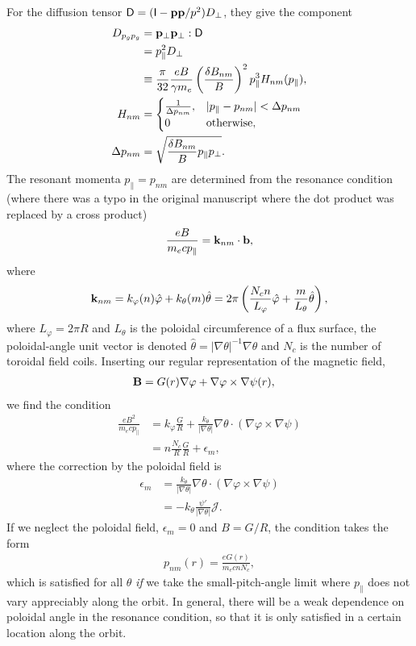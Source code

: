 \documentclass[11pt,a4paper]{article}
\renewcommand{\b}[1]{\ensuremath{ {\bf #1 } }}
\begin{document}
For the diffusion tensor $\mathsf{D} = (\mathsf{I}-\b{p}\b{p}/p^2)D_\perp$, they give the component
\begin{align}
D_{p_g p_g} &=  \b{p}_\perp\b{p}_\perp: \mathsf{D} \nonumber \\
&= p_\parallel^2 D_\perp  \nonumber \\
&\equiv \frac{\pi}{32}\frac{eB}{\gamma m_e}\left(\frac{\delta B_{nm}}{B}\right)^2 p_\parallel^3 H_{nm}(p_\parallel), \nonumber \\
H_{nm} &= \begin{cases}
\frac{1}{\Delta p_{nm}}, & |p_\parallel - p_{nm}| < \Delta p_{nm} \\
0 & \text{otherwise},
\end{cases} \nonumber \\
\Delta p_{nm} &= \sqrt{\frac{\delta B_{nm}}{B}p_\parallel p_\perp}.
\end{align}
The resonant momenta $p_\parallel = p_{nm}$ are determined from the resonance condition (where there was a typo in the original manuscript where the dot product was replaced by a cross product)
\begin{align}
\frac{eB}{m_e c p_\parallel} = \b{k}_{nm}\cdot \b{b}  ,
\end{align}
where 
\begin{align}
\b{k}_{nm} = k_\varphi(n) \hat\varphi + k_\theta(m) \hat\theta = 2\pi \left( \frac{N_c n}{L_\varphi} \hat\varphi + \frac{m}{L_\theta}\hat{\theta} \right),
\end{align}
where $L_\varphi = 2\pi R$ and $L_\theta$ is the poloidal circumference of a flux surface, the poloidal-angle unit vector is denoted $\hat{\theta} = |\nabla \theta|^{-1}\nabla \theta$ and $N_c$ is the number of toroidal field coils. Inserting our regular representation of the magnetic field,
\begin{align}
\b{B} &= G(r) \nabla \varphi + \nabla \varphi \times \nabla \psi(r),
\end{align}
we find the condition
\begin{align}
\frac{e B^2}{m_e c p_\parallel} &= k_\varphi \frac{G}{R} + \frac{k_\theta }{|\nabla \theta|} \nabla \theta \cdot(\nabla \varphi\times\nabla \psi) \nonumber \\
&= n\frac{N_c}{R}\frac{G}{R} + \epsilon_m,
\end{align}
where the correction by the poloidal field is 
\begin{align}
\epsilon_m &=  \frac{k_\theta }{|\nabla \theta|} \nabla \theta \cdot(\nabla \varphi\times\nabla \psi) \nonumber \\
&= - k_\theta\frac{\psi'}{|\nabla \theta|} \mathcal{J}.
\end{align}
If we neglect the poloidal field, $\epsilon_m=0$ and $B=G/R$, the condition takes the form
\begin{align}
p_{nm}(r) = \frac{e G(r)}{m_e c n N_c},
\end{align}
which is satisfied for all $\theta$ \emph{if} we take the small-pitch-angle limit where $p_\parallel$ does not vary appreciably along the orbit. In general, there will be a weak dependence on poloidal angle in the resonance condition, so that it is only satisfied in a certain location along the orbit.
\end{document}
